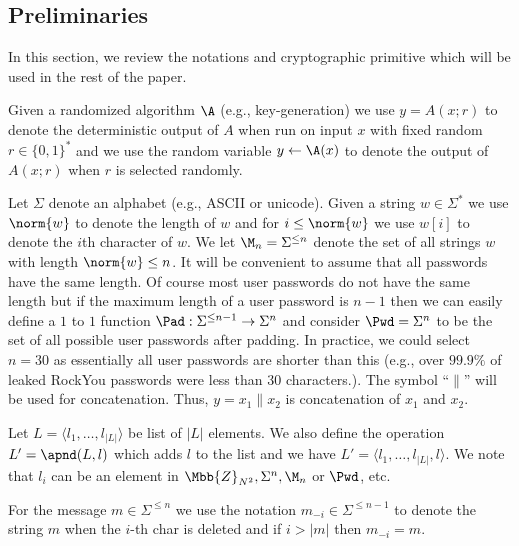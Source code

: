 
\subsection{Preliminaries}
In this section, we review the notations and cryptographic primitive which will be used in the rest of the paper. \newline 

Given a randomized algorithm $\A$ (e.g., key-generation)  we use $y=A(x;r)$ to denote the deterministic output of $A$ when run on input $x$ with fixed random $r \in \{0,1\}^*$ and we use the random variable  $y \leftarrow \A(x)$ to denote the output of $A(x;r)$ when $r$ is selected randomly.  

Let  $ \Sigma $ denote an alphabet (e.g., ASCII or unicode). Given a string $w \in \Sigma^*$ we use $\norm{w}$ to denote the length of $w$ and for $i \leq \norm{w}$ we use $w[i]$ to denote the $i$th character of $w$. We let $\M_n = \Sigma^{\leq n}$ denote the set of all strings $w$ with length $\norm{w} \leq n$. It will be convenient to assume that all passwords have the same length. Of course most user passwords do not have the same length but if the maximum length of a user password is $n-1$ then we can easily define a $1$ to $1$ function $\Pad:\Sigma^{\leq n-1} \rightarrow \Sigma^n$ and consider $\Pwd = \Sigma^n$ to be the set of all possible user passwords after padding. In practice, we could select $n=30$ as essentially all user passwords are shorter than this (e.g., over $99.9\%$ of leaked RockYou passwords were less than 30 characters.). The symbol ``$\|$'' will be used for concatenation. Thus, $ y = x_1 \| x_2 $ is concatenation of $ x_1 $ and $ x_2 $. \newline

Let $ L = \langle l_1, \ldots, l_{|L|}  \rangle $ be list of $ |L| $ elements. We also define the operation $ L' = \apnd(L, l) $ which adds $ l $ to the list and we have $ L' =  \langle l_1, \ldots, l_{|L|}, l \rangle $. We note that $ l_i $ can be an element in $ \Mbb{Z}_{N^2}, \Sigma^n, \M_n$ or $ \Pwd $, etc.  \newline

For the message $m \in \Sigma^{\leq n}$ we use the notation  $m_{-i} \in \Sigma^{\leq n-1} $ to denote the string $ m$ when the $ i $-th char is deleted and if $i > |m|$ then $m_{-i}=m$.

